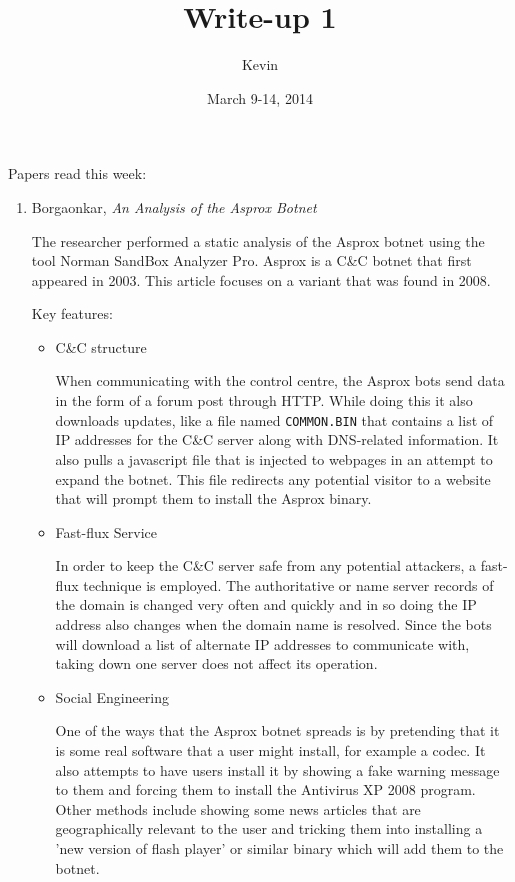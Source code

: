 \documentclass{article}
\title{Write-up 1}
\author{Kevin}
\date{March 9-14, 2014}
\begin{document}
	\maketitle
	
	Papers read this week:
	\begin{enumerate}
		\item Borgaonkar, \emph{An Analysis of the Asprox Botnet}\cite{borgaonkar-analysis}
		
		The researcher performed a static analysis of the Asprox botnet using the tool Norman SandBox Analyzer Pro. Asprox is a C\&C botnet that first appeared in 2003. This article focuses on a variant that was found in 2008.
		
		Key features:
		\begin{itemize}
			\item C\&C structure
			
			When communicating with the control centre, the Asprox bots send data in the form of a forum post through HTTP. While doing this it also downloads updates, like a file named \texttt{COMMON.BIN} that contains a list of IP addresses for the C\&C server along with DNS-related information. It also pulls a javascript file that is injected to webpages in an attempt to expand the botnet. This file redirects any potential visitor to a website that will prompt them to install the Asprox binary.	
			\item Fast-flux Service
			
			In order to keep the C\&C server safe from any potential attackers, a fast-flux technique is employed. The authoritative or name server records of the domain is changed very often and quickly and in so doing the IP address also changes when the domain name is resolved. Since the bots will download a list of alternate IP addresses to communicate with, taking down one server does not affect its operation.
			
			\item Social Engineering
			
			One of the ways that the Asprox botnet spreads is by pretending that it is some real software that a user might install, for example a codec. It also attempts to have users install it by showing a fake warning message to them and forcing them to install the Antivirus XP 2008 program. Other methods include showing some news articles that are  geographically relevant to the user and tricking them into installing a 'new version of flash player' or similar binary which will add them to the botnet.
			

\end{itemize}
\end{enumerate}
\end{document}
